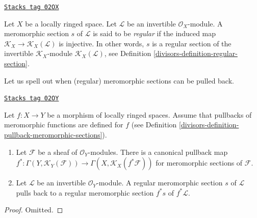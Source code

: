 \begin{definition}
\label{divisors-definition-regular-meromorphic-section}
\href{https://stacks.math.columbia.edu/tag/02OX}{\texttt{Stacks tag 02OX}}

Let $X$ be a locally ringed space.
Let $\mathcal{L}$ be an invertible $\mathcal{O}_X$-module.
A meromorphic section $s$ of $\mathcal{L}$ is said to be {\it regular}
if the induced map
$\mathcal{K}_X \to \mathcal{K}_X(\mathcal{L})$
is injective. In other words, $s$ is a regular
section of the invertible $\mathcal{K}_X$-module
$\mathcal{K}_X(\mathcal{L})$, see
Definition \ref{divisors-definition-regular-section}.
\end{definition}

Let us spell out when (regular) meromorphic sections can be pulled back.

\begin{lemma}
\label{divisors-lemma-meromorphic-sections-pullback}
\href{https://stacks.math.columbia.edu/tag/02OY}{\texttt{Stacks tag 02OY}}

Let $f : X \to Y$ be a morphism of locally ringed spaces.
Assume that pullbacks of meromorphic functions are defined
for $f$ (see
Definition \ref{divisors-definition-pullback-meromorphic-sections}).
\begin{enumerate}
\item Let $\mathcal{F}$ be a sheaf of $\mathcal{O}_Y$-modules.
There is a canonical pullback map
$f^* : \Gamma(Y, \mathcal{K}_Y(\mathcal{F})) \to
\Gamma(X, \mathcal{K}_X(f^*\mathcal{F}))$
for meromorphic sections of $\mathcal{F}$.
\item Let $\mathcal{L}$ be an invertible $\mathcal{O}_Y$-module.
A regular meromorphic section $s$ of $\mathcal{L}$ pulls back
to a regular meromorphic section $f^*s$ of $f^*\mathcal{L}$.
\end{enumerate}
\end{lemma}

\begin{proof}
Omitted.
\end{proof}

